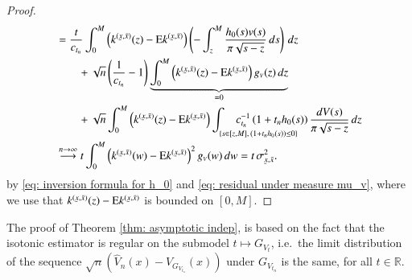\begin{proof}
\begin{align*}
        & =  \frac{t}{c_{t_n}} \int_{0}^{M} \left( k^{(\ubar{x},\bar{x})}(z) - \ex k^{(\ubar{x},\bar{x})}  \right) \left(- \int_{z}^{M} \frac{h_0(s) v(s)}{\pi \sqrt{s-z}} \, ds \right) \, dz\\
        & \quad \quad + \sqrt{n}\left( \frac{1}{c_{t_n}} -1 \right) \underbrace{\int_{0}^{M} \left( k^{(\ubar{x},\bar{x})}(z) - \ex k^{(\ubar{x},\bar{x})}  \right) g_{\scriptscriptstyle{V}} (z) \, dz}_{=0} \\
        & \quad \quad + \sqrt{n} \int_{0}^{M} \left( k^{(\ubar{x},\bar{x})}(z) - \ex k^{(\ubar{x},\bar{x})}  \right) \int_{\substack{\phantom{space} \\ \{   s \in [z, M], \, (1+t_n h_0(s)) \leq 0\}}} \hspace{-2cm} c_{t_n}^{-1} \left(1+t_n h_0(s)\right) \frac{dV(s)}{\pi \sqrt{s-z}} \, dz\\
        &\stackrel{n \rightarrow \infty}{\longrightarrow} t \int_{0}^{M} \left( k^{(\ubar{x},\bar{x})}(w) - \ex k^{(\ubar{x},\bar{x})}  \right)^2  g_{\scriptscriptstyle{V}}(w) \, dw = t \, \sigma^2_{\ubar{x},\bar{x}}.
    \end{align*}
   by \eqref{eq: inversion formula for h_0} and \eqref{eq: residual under measure mu_v}, where we use that $k^{(\ubar{x},\bar{x})}(z) - \ex k^{(\ubar{x},\bar{x})}$ is bounded on $[0,M]$.
\end{proof}

The proof of Theorem \ref{thm: asymptotic indep}, is based on the fact that the isotonic estimator is regular on the submodel $t \mapsto G_{\scriptscriptstyle{V_t}}$, i.e.\ the limit distribution of the sequence $\sqrt{n}(\hat{V}_n (x) - V_{\scriptscriptstyle{G_{V_{t_n}}}} (x))$ under $G_{\scriptscriptstyle{V_{t_n}}}$ is the same, for all $t \in \mathbb{R}$.


